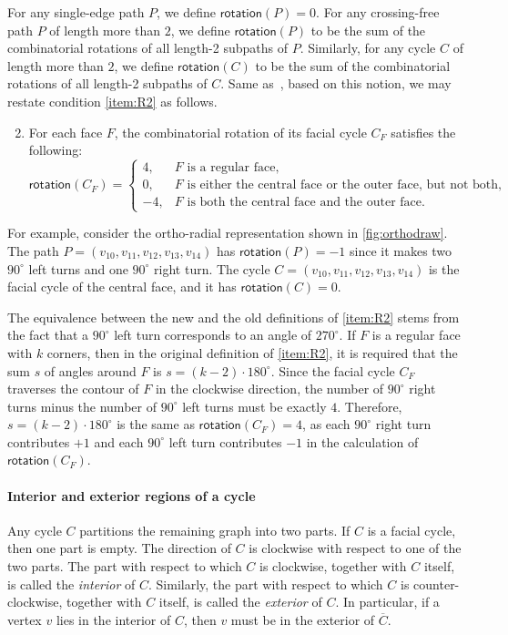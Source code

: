 \documentclass{theoretics}
\newcommand{\rotation}{\mathsf{rotation}}
\begin{document}
For any single-edge path $P$, we define $\rotation(P) = 0$.
For any crossing-free path $P$ of length more than $2$, we define $\rotation(P)$ to be the sum of the combinatorial rotations of all length-2 subpaths of $P$. Similarly, for any cycle $C$ of length more than $2$, we define $\rotation(C)$ to be the sum of the combinatorial rotations of all length-2 subpaths of $C$.  Same as~\cite{barth2023topology}, based on this notion, we may restate condition \ref{item:R2} as follows.

\begin{enumerate}[(R1$'$)]\setcounter{enumi}{1}
    \item For each face $F$, the combinatorial rotation of its facial cycle $C_F$ satisfies the following:
\[\rotation(C_F)=\begin{cases}
			4, & \text{$F$ is a regular face,}\\
            0, & \text{$F$ is either the central face or the outer face, but not both,}\\
            -4, & \text{$F$ is both the central face and the outer face.}
		 \end{cases}\]
\end{enumerate}

For example, consider the ortho-radial representation shown in \cref{fig:orthodraw}. The path $P=(v_{10}, v_{11}, v_{12}, v_{13}, v_{14})$  has $\rotation(P) = -1$ since it makes two $90^\circ$  left turns and one $90^\circ$ right turn. The cycle $C=(v_{10}, v_{11}, v_{12}, v_{13}, v_{14})$ is the facial cycle of the central face, and it has $\rotation(C) = 0$.

The equivalence between the new and the old definitions of \ref{item:R2} stems from the fact that a $90^\circ$ left turn corresponds to an angle of $270^\circ$.
If $F$ is a regular face with $k$ corners, then in the original definition of \ref{item:R2}, it is required that the sum $s$ of angles around $F$ is $s = (k-2)\cdot 180^\circ$. Since the facial cycle $C_F$ traverses the contour of $F$ in the clockwise direction, the number of $90^\circ$ right turns minus the number of $90^\circ$ left turns must be exactly $4$. Therefore, $s = (k-2)\cdot 180^\circ$ is the same as $\rotation(C_F) = 4$, as each $90^\circ$ right turn contributes $+1$ and each $90^\circ$ left turn contributes $-1$ in the calculation of $\rotation(C_F)$.  

\paragraph{Interior and exterior regions of a cycle}
Any cycle $C$ partitions the remaining graph into two parts. If $C$ is a facial cycle, then one part is empty. The direction of $C$ is clockwise with respect to one of the two parts. The part with respect to which $C$ is clockwise, together with $C$ itself, is called the \emph{interior} of $C$. Similarly, the part with respect to which $C$ is counter-clockwise, together with $C$ itself, is called the \emph{exterior} of $C$. In particular, if a vertex $v$ lies in the interior of $C$, then $v$ must be in the exterior of $\overline{C}$. 
\end{document}
